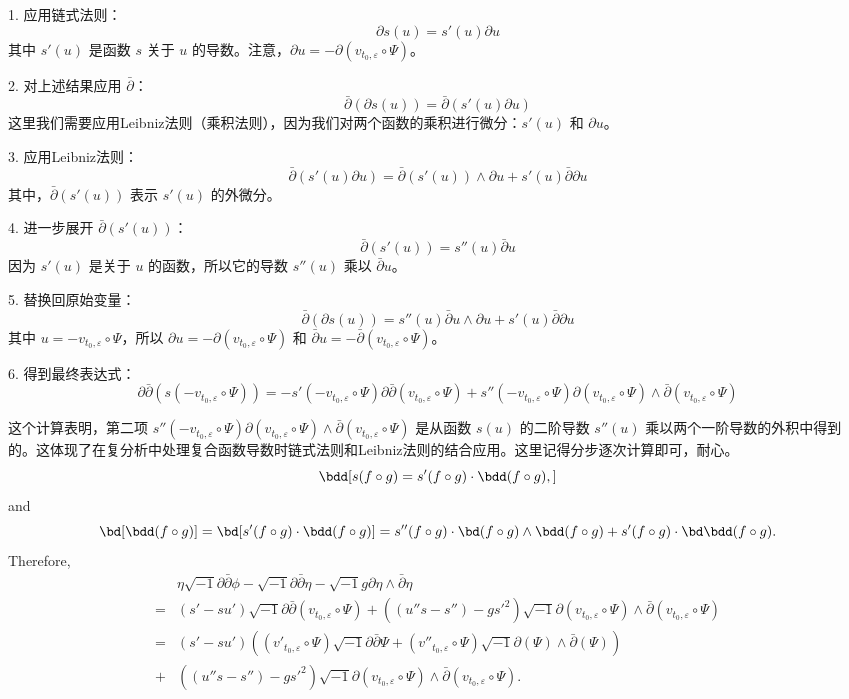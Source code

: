 1. 应用链式法则：
   \[
   \partial s(u) = s'(u) \partial u
   \]
   其中 \(s'(u)\) 是函数 \(s\) 关于 \(u\) 的导数。注意，\(\partial u = -\partial(v_{t_0,\varepsilon} \circ \Psi)\)。

2. 对上述结果应用 \(\bar{\partial}\)：
   \[
   \bar{\partial}(\partial s(u)) = \bar{\partial}(s'(u) \partial u)
   \]
   这里我们需要应用Leibniz法则（乘积法则），因为我们对两个函数的乘积进行微分：\(s'(u)\) 和 \(\partial u\)。

3. 应用Leibniz法则：
   \[
   \bar{\partial}(s'(u) \partial u) = \bar{\partial}(s'(u)) \wedge \partial u + s'(u) \bar{\partial}\partial u
   \]
   其中，\(\bar{\partial}(s'(u))\) 表示 \(s'(u)\) 的外微分。

4. 进一步展开 \(\bar{\partial}(s'(u))\)：
   \[
   \bar{\partial}(s'(u)) = s''(u) \bar{\partial}u
   \]
   因为 \(s'(u)\) 是关于 \(u\) 的函数，所以它的导数 \(s''(u)\) 乘以 \(\bar{\partial}u\)。

5. 替换回原始变量：
   \[
   \bar{\partial}(\partial s(u)) = s''(u) \bar{\partial}u \wedge \partial u + s'(u) \bar{\partial}\partial u
   \]
   其中 \(u = -v_{t_0,\varepsilon} \circ \Psi\)，所以 \(\partial u = -\partial(v_{t_0,\varepsilon} \circ \Psi)\) 和 \(\bar{\partial}u = -\bar{\partial}(v_{t_0,\varepsilon} \circ \Psi)\)。

6. 得到最终表达式：
   \[
   \partial\bar{\partial}(s(-v_{t_0,\varepsilon} \circ \Psi)) = -s'(-v_{t_0,\varepsilon} \circ \Psi) \partial\bar{\partial}(v_{t_0,\varepsilon} \circ \Psi) + s''(-v_{t_0,\varepsilon} \circ \Psi) \partial(v_{t_0,\varepsilon} \circ \Psi) \wedge \bar{\partial}(v_{t_0,\varepsilon} \circ \Psi)
   \]

这个计算表明，第二项 \(s''(-v_{t_0,\varepsilon} \circ \Psi) \partial(v_{t_0,\varepsilon} \circ \Psi) \wedge \bar{\partial}(v_{t_0,\varepsilon} \circ \Psi)\) 是从函数 \(s(u)\) 的二阶导数 \(s''(u)\) 乘以两个一阶导数的外积中得到的。这体现了在复分析中处理复合函数导数时链式法则和Leibniz法则的结合应用。这里记得分步逐次计算即可，耐心。
\[\bdd[s(f\circ g)=s'(f\circ g)\cdot \bdd(f\circ g),]\]
and
\[\bd[\bdd(f\circ g)]=\bd[s'(f\circ g)\cdot \bdd(f\circ g)]=s''(f\circ g)\cdot \bd(f\circ g)\wedge \bdd (f\circ g)+s'(f\circ g)\cdot \bd\bdd(f\circ g).\]
Therefore,
\begin{equation}
\label{equ:smooth.vector1}
\begin{split}
&\eta\sqrt{-1}\partial\bar\partial\phi-\sqrt{-1}\partial\bar\partial\eta-
\sqrt{-1}g\partial\eta\wedge\bar\partial\eta
\\=&(s'-su')\sqrt{-1}\partial\bar{\partial}(v_{t_0,\varepsilon}\circ \Psi)
+((u''s-s'')-gs'^{2})\sqrt{-1}\partial(v_{t_0,\varepsilon}\circ \Psi)
\wedge\bar{\partial}(v_{t_0,\varepsilon}\circ \Psi)
\\=&
(s'-su')((v'_{t_0,\varepsilon}\circ\Psi)\sqrt{-1}\partial\bar{\partial}
\Psi+(v''_{t_0,\varepsilon}\circ \Psi)\sqrt{-1}\partial(\Psi)\wedge\bar{\partial}(\Psi))
\\+&((u''s-s'')-gs'^{2})\sqrt{-1}\partial(v_{t_0,\varepsilon}\circ \Psi)
\wedge\bar{\partial}(v_{t_0,\varepsilon}\circ \Psi).
\end{split}
\end{equation}

